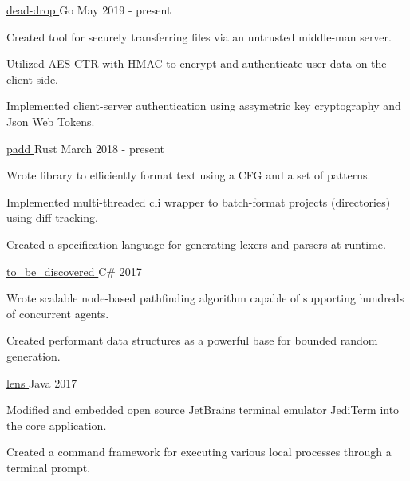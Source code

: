
\begin{cventries}
  
  {\href{https://github.com/srhickma/dead-drop}{dead-drop \faExternalLink}} {Go}
  {May 2019 - present} {
    \begin{cvitems}
    \item Created tool for securely transferring files via an untrusted
      middle-man server.
    \item Utilized AES-CTR with HMAC to encrypt and authenticate user data on
      the client side.
    \item Implemented client-server authentication using assymetric key
      cryptography and Json Web Tokens.
    \end{cvitems}
  }
  
  {\href{https://github.com/srhickma/padd}{padd \faExternalLink}} {Rust} {March
    2018 - present} {
    \begin{cvitems}
    \item Wrote library to efficiently format text using a CFG and a set of
      patterns.
    \item Implemented multi-threaded cli wrapper to batch-format projects
      (directories) using diff tracking.
    \item Created a specification language for generating lexers and parsers at
      runtime.
    \end{cvitems}
  }
  
  {\href{https://github.com/srhickma/to\_be\_discovered}{to\_be\_discovered
      \faExternalLink}} {C\#} {2017} {
    \begin{cvitems}
    \item Wrote scalable node-based pathfinding algorithm capable of supporting
      hundreds of concurrent agents.
    \item Created performant data structures as a powerful base for bounded
      random generation.
    \end{cvitems}
  }
  
  {\href{https://github.com/srhickma/lens}{lens \faExternalLink}} {Java} {2017}
  {
    \begin{cvitems}
    \item Modified and embedded open source JetBrains terminal emulator JediTerm
      into the core application.
    \item Created a command framework for executing various local processes
      through a terminal prompt.
    \end{cvitems}
  }
  

\end{cventries}
